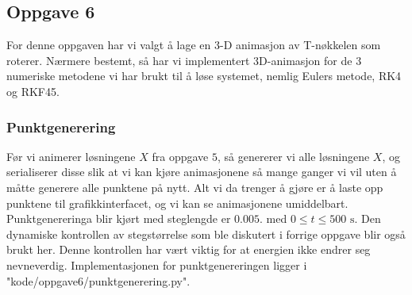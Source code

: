 \subsection{Oppgave 6}
\label{section:oppgave6}
For denne oppgaven har vi valgt å lage en 3-D animasjon av T-nøkkelen som roterer. Nærmere bestemt, så har vi implementert 3D-animasjon for de $3$ numeriske metodene vi har brukt til å løse systemet, nemlig Eulers metode, RK4 og RKF45.

\subsubsection{Punktgenerering}
Før vi animerer løsningene $X$ fra oppgave $5$, så genererer vi alle løsningene $X$, og serialiserer disse slik at vi kan kjøre animasjonene så mange ganger vi vil uten å måtte generere alle punktene på nytt. Alt vi da trenger å gjøre er å laste opp punktene til grafikkinterfacet, og vi kan se animasjonene umiddelbart. Punktgenereringa blir kjørt med steglengde er $0.005.$ med $0\leq t \leq 500\text{ s}.$ Den dynamiske kontrollen av stegstørrelse som ble diskutert i forrige oppgave blir også brukt her. Denne kontrollen har vært viktig for at energien ikke endrer seg nevneverdig. Implementasjonen for punktgenereringen ligger i "kode/oppgave6/punktgenerering.py".

